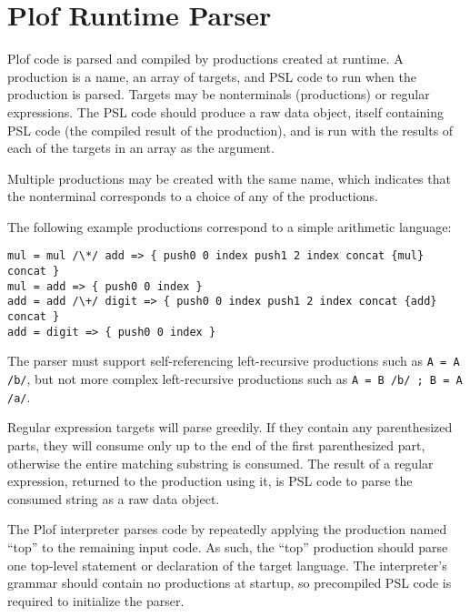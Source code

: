 \chapter{Plof Runtime Parser}

Plof code is parsed and compiled by productions created at runtime. A production is a name, an array of targets, and PSL code to run when the production is parsed. Targets may be nonterminals (productions) or regular expressions. The PSL code should produce a raw data object, itself containing PSL code (the compiled result of the production), and is run with the results of each of the targets in an array as the argument.

Multiple productions may be created with the same name, which indicates that the nonterminal corresponds to a choice of any of the productions.

The following example productions correspond to a simple arithmetic language:

\begin{verbatim}
mul = mul /\*/ add => { push0 0 index push1 2 index concat {mul} concat }
mul = add => { push0 0 index }
add = add /\+/ digit => { push0 0 index push1 2 index concat {add} concat }
add = digit => { push0 0 index }
\end{verbatim}

The parser must support self-referencing left-recursive productions such as \texttt{A = A /b/}, but not more complex left-recursive productions such as \texttt{A = B /b/ ; B = A /a/}.

Regular expression targets will parse greedily. If they contain any parenthesized parts, they will consume only up to the end of the first parenthesized part, otherwise the entire matching substring is consumed. The result of a regular expression, returned to the production using it, is PSL code to parse the consumed string as a raw data object.

The Plof interpreter parses code by repeatedly applying the production named ``top'' to the remaining input code. As such, the ``top'' production should parse one top-level statement or declaration of the target language. The interpreter's grammar should contain no productions at startup, so precompiled PSL code is required to initialize the parser.
